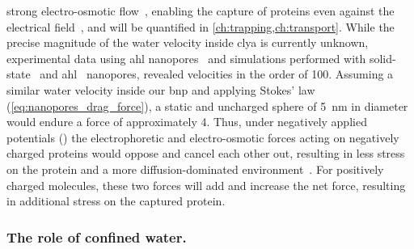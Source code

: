 strong electro-osmotic flow~\cite{Franceschini-2016}, enabling the capture of proteins even against the
electrical field~\cite{Soskine-2012}, and will be quantified in \cref{ch:trapping,ch:transport}. While the
precise magnitude of the water velocity inside \gls{clya} is currently unknown, experimental data using
\gls{ahl} nanopores~\cite{Paula-1999} and simulations performed with solid-state~\cite{vanDorp-2009,Luan-2008}
and \gls{ahl}~\cite{Aksimentiev-2005,Pederson-2015} nanopores, revealed velocities in the order of
\SI{100}{\mmps}. Assuming a similar water velocity inside our \gls{bnp} and applying Stokes' law
(\cref{eq:nanopores_drag_force}), a static and uncharged sphere of \SI{5}{\nm} in diameter would endure a
force of approximately \SI{4}{\pN}. Thus, under negatively applied potentials (\transi{}) the electrophoretic
and electro-osmotic forces acting on negatively charged proteins would oppose and cancel each other out,
resulting in less stress on the protein and a more diffusion-dominated environment~\cite{Firnkes-2010}. For
positively charged molecules, these two forces will add and increase the net force, resulting in additional
stress on the captured protein.

\subsubsection{The role of confined water.}
%

